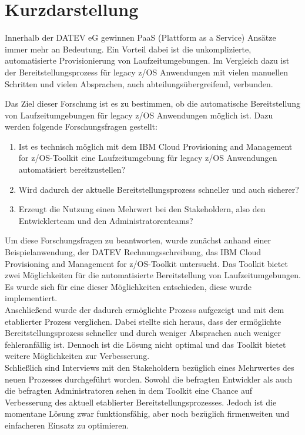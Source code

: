 \thispagestyle{empty}
\section*{Kurzdarstellung}
\label{sec:kurzdarstellung}
Innerhalb der DATEV eG gewinnen PaaS (Plattform as a Service) Ansätze immer mehr an Bedeutung.
Ein Vorteil dabei ist die unkomplizierte, automatisierte Provisionierung von Laufzeitumgebungen.
Im Vergleich dazu ist der Bereitstellungsprozess für legacy z/OS Anwendungen mit vielen manuellen Schritten und vielen Absprachen, auch abteilungsübergreifend, verbunden.

Das Ziel dieser Forschung ist es zu bestimmen, ob die automatische Bereitstellung von Laufzeitumgebungen für legacy z/OS Anwendungen möglich ist.
Dazu werden folgende Forschungsfragen gestellt:
\begin{enumerate}
\item Ist es technisch möglich mit dem \glqq IBM Cloud Provisioning and Management for z/OS\grqq-Toolkit eine Laufzeitumgebung für legacy z/OS Anwendungen automatisiert bereitzustellen?
\item Wird dadurch der aktuelle Bereitstellungsprozess schneller und auch sicherer?
\item Erzeugt die Nutzung einen Mehrwert bei den Stakeholdern, also den Entwicklerteam und den Administratorenteams?
\end{enumerate}
Um diese Forschungsfragen zu beantworten, wurde zunächst anhand einer Beispielanwendung, der DATEV Rechnungsschreibung, das \glqq IBM Cloud Provisioning and Management for z/OS\grqq-Toolkit untersucht.
Das Toolkit bietet zwei Möglichkeiten für die automatisierte Bereitstellung von Laufzeitumgebungen.
Es wurde sich für eine dieser Möglichkeiten entschieden, diese wurde implementiert.\\
Anschließend wurde der dadurch ermöglichte Prozess aufgezeigt und mit dem etablierter Prozess verglichen.
Dabei stellte sich heraus, dass der ermöglichte Bereitstellungsprozess schneller und durch weniger Absprachen auch weniger fehleranfällig ist.
Dennoch ist die Lösung nicht optimal und das Toolkit bietet weitere Möglichkeiten zur Verbesserung.\\
Schließlich sind Interviews mit den Stakeholdern bezüglich eines Mehrwertes des neuen Prozesses durchgeführt worden.
Sowohl die befragten Entwickler als auch die befragten Administratoren sehen in dem Toolkit eine Chance auf Verbesserung des aktuell etablierter Bereitstellungsprozesses.
Jedoch ist die momentane Lösung zwar funktionsfähig, aber noch bezüglich firmenweiten und einfacheren Einsatz zu optimieren.

